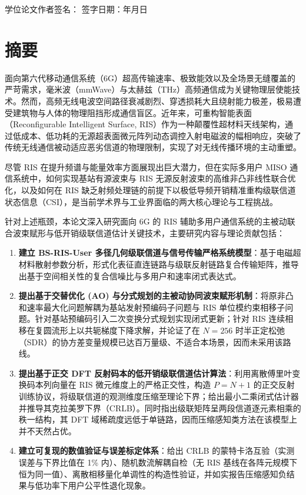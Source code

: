 \documentclass[12pt,a4paper,openany,UTF8]{ctexrep}
\begin{document}
\vspace{1.5cm}
\begin{flushright}
  学位论文作者签名：\underline{\hspace{3cm}} \qquad
  签字日期：\qquad 年\quad 月\quad 日
\end{flushright}
\newpage

\chapter*{摘\quad 要}

面向第六代移动通信系统（6G）超高传输速率、极致能效以及全场景无缝覆盖的严苛需求，毫米波（mmWave）与太赫兹（THz）高频通信成为关键物理层使能技术。然而，高频无线电波空间路径衰减剧烈、穿透损耗大且绕射能力极差，极易遭受建筑物与人体的物理阻挡形成通信盲区。近年来，可重构智能表面（Reconfigurable Intelligent Surface, RIS）作为一种颠覆性超材料天线架构，通过低成本、低功耗的无源超表面微元阵列动态调控入射电磁波的幅相响应，突破了传统无线通信被动适应恶劣信道的物理限制，实现了对无线传播环境的主动重塑。

尽管 RIS 在提升频谱与能量效率方面展现出巨大潜力，但在实际多用户 MISO 通信系统中，如何实现基站有源波束与 RIS 无源反射波束的高维非凸非线性联合优化，以及如何在 RIS 缺乏射频处理链的前提下以极低导频开销精准重构级联信道状态信息（CSI），是当前学术界与工业界面临的两大核心理论与工程挑战。

针对上述瓶颈，本论文深入研究面向 6G 的 RIS 辅助多用户通信系统的主被动联合波束赋形与低开销级联信道估计关键技术，主要研究内容与理论贡献包括：
\begin{enumerate}
  \item \textbf{建立 BS-RIS-User 多径几何级联信道与信号传输严格系统模型}：基于电磁超材料散射参数分析，形式化表征直连链路与级联反射链路复合传输矩阵，推导出基于空间相关性的复合信噪比与多用户和速率闭式表达式。
  \item \textbf{提出基于交替优化 (AO) 与分式规划的主被动协同波束赋形机制}：将原非凸和速率最大化问题解耦为基站发射预编码子问题与 RIS 单位模约束相移子问题。针对基站预编码引入二次变换分式规划实现闭式更新；针对 RIS 连续相移在复圆流形上以共轭梯度下降求解，并论证了在 $N = 256$ 时半正定松弛（SDR）的协方差变量规模已达百万量级、不适合本场景，因而未采用该路线。
  \item \textbf{提出基于正交 DFT 反射码本的低开销级联信道估计算法}：利用离散傅里叶变换码本列向量在 RIS 微元维度上的严格正交性，构造 $P = N+1$ 的正交反射训练协议，将级联信道的观测维度压缩至理论下界；给出最小二乘闭式估计器并推导其克拉美罗下界（CRLB）。同时指出级联矩阵呈两段信道逐元素相乘的秩一结构，其 DFT 域稀疏度远低于单链路，因而压缩感知类方法在该模型上并不天然占优。
  \item \textbf{建立可复现的数值验证与误差标定体系}：给出 CRLB 的蒙特卡洛互验（实测误差与下界比值在 1\% 内）、随机数流解耦自检（无 RIS 基线在各阵元规模下恒为同一值）、离散相移量化单调性的构造性验证，并如实报告压缩感知负结果与低功率下用户公平性退化现象。
\end{enumerate}
\end{document}
